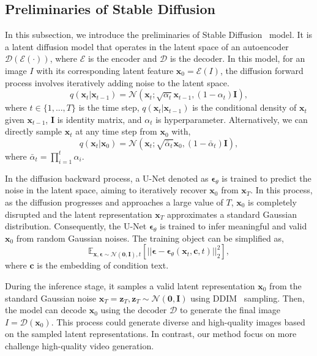 \subsection{Preliminaries of Stable Diffusion}
\label{preliminaries}
In this subsection, we introduce the preliminaries of Stable Diffusion~\cite{stablediffusion} model.
It is a latent diffusion model that operates in the latent space of an autoencoder $\mathcal{D}(\mathcal{E}(\cdot))$, where $\mathcal{E}$ is the encoder and $\mathcal{D}$ is the decoder.
In this model, for an image $I$ with its corresponding latent feature $\bm{x}_0=\mathcal{E}(I)$, the diffusion forward process involves iteratively adding noise to the latent space.
\begin{equation}
  q(\bm{x}_t|\bm{x}_{t-1})=\mathcal{N}(\bm{x}_t;\sqrt{\alpha_t}\bm{x}_{t-1}, (1-\alpha_t)\mathbf{I}),
\end{equation}
where $t\in\{1,...,T\}$ is the time step, $q(\bm{x}_t|\bm{x}_{t-1})$ is the conditional density of $\bm{x}_t$ given $\bm{x}_{t-1}$, $\mathbf{I}$ is identity matrix, and $\alpha_t$ is hyperparameter.
Alternatively, we can directly sample $\bm{x}_t$ at any time step from $\bm{x}_0$ with,
\begin{equation}\label{eq:forward_sample}
  q(\bm{x}_t|\bm{x}_{0})=\mathcal{N}(\bm{x}_t;\sqrt{\bar{\alpha}_t}\bm{x}_0, (1-\bar{\alpha}_t)\mathbf{I}),
\end{equation}
where $\bar{\alpha}_t=\prod_{i=1}^t\alpha_i$.

In the diffusion backward process, a U-Net denoted as $\bm{\epsilon}_\theta$ is trained to predict the noise in the latent space, aiming to iteratively recover $\bm{x}_0$ from $\bm{x}_T$. In this process, as the diffusion progresses and approaches a large value of $T$, $\bm{x}_0$ is completely disrupted and the latent representation $\bm{x}_T$ approximates a standard Gaussian distribution. Consequently, the U-Net $\bm{\epsilon}_\theta$ is trained to infer meaningful and valid $\bm{x}_0$ from random Gaussian noises. The training object can be simplified as,
\begin{equation}
\mathbb{E}_{\bm{x},\bm{\epsilon} \sim \mathcal{N}(\bm{0},\mathbf{I}),t}[\lvert\lvert \bm{\epsilon} - \bm{\epsilon}_\theta(\bm{x}_t,\bm{c},t)\rvert\rvert^2_2],
\end{equation}
where $\bm{c}$ is the embedding of condition text.

During the inference stage, it samples a valid latent representation $\bm{x}_0$ from the standard Gaussian noise $\bm{x}_T=\bm{z}_T, \bm{z}_T\sim\mathcal{N}(\bm{0}, \mathbf{I})$ using DDIM~\cite{ddim} sampling. Then, the model can decode $\bm{x}_0$ using the decoder $\mathcal{D}$ to generate the final image $I=\mathcal{D}(\bm{x}_0)$. This process could generate diverse and high-quality images based on the sampled latent representations. In contrast, our method focus on more challenge high-quality video generation.


